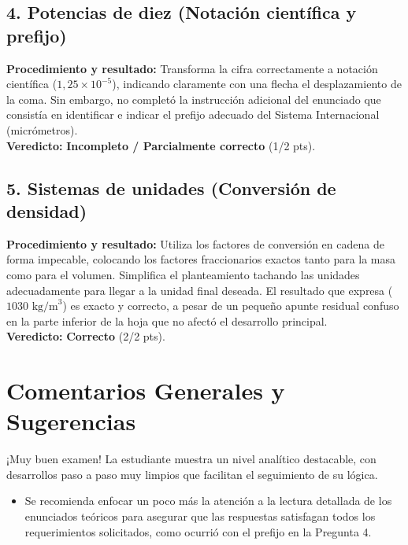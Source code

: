 \documentclass[12pt]{article}
\begin{document}
\subsection*{4. Potencias de diez (Notación científica y prefijo)}
\textbf{Procedimiento y resultado:} Transforma la cifra correctamente a notación científica ($1,25 \times 10^{-5}$), indicando claramente con una flecha el desplazamiento de la coma. Sin embargo, no completó la instrucción adicional del enunciado que consistía en identificar e indicar el prefijo adecuado del Sistema Internacional (micrómetros). \\
\textbf{Veredicto:} \textbf{Incompleto / Parcialmente correcto} (1/2 pts).

\subsection*{5. Sistemas de unidades (Conversión de densidad)}
\textbf{Procedimiento y resultado:} Utiliza los factores de conversión en cadena de forma impecable, colocando los factores fraccionarios exactos tanto para la masa como para el volumen. Simplifica el planteamiento tachando las unidades adecuadamente para llegar a la unidad final deseada. El resultado que expresa ($1030 \text{ kg/m}^3$) es exacto y correcto, a pesar de un pequeño apunte residual confuso en la parte inferior de la hoja que no afectó el desarrollo principal. \\
\textbf{Veredicto:} \textbf{Correcto} (2/2 pts).

\vspace{0.5cm}
\section*{Comentarios Generales y Sugerencias}
¡Muy buen examen! La estudiante muestra un nivel analítico destacable, con desarrollos paso a paso muy limpios que facilitan el seguimiento de su lógica.
\begin{itemize}
    \item Se recomienda enfocar un poco más la atención a la lectura detallada de los enunciados teóricos para asegurar que las respuestas satisfagan todos los requerimientos solicitados, como ocurrió con el prefijo en la Pregunta 4.
\end{itemize}
\end{document}
